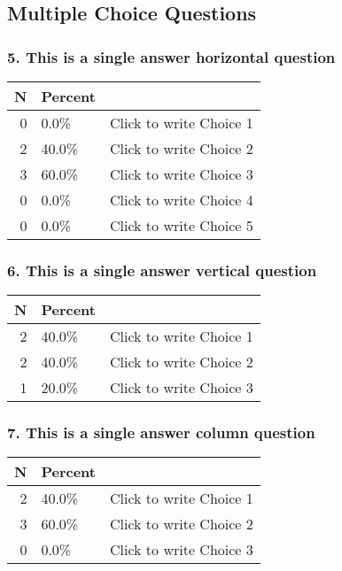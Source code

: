 \documentclass{article}\usepackage[]{graphicx}\usepackage[]{color}
\begin{document}
\hfill \break \hfill \break
\subsection*{Multiple Choice Questions}
\subsubsection*{5.
This is a single answer horizontal question}

\begin{tabular}{r|l|l}
\hline
N & Percent & \\
\hline
0 & 0.0\% & Click to write Choice 1\\
\hline
2 & 40.0\% & Click to write Choice 2\\
\hline
3 & 60.0\% & Click to write Choice 3\\
\hline
0 & 0.0\% & Click to write Choice 4\\
\hline
0 & 0.0\% & Click to write Choice 5\\
\hline
\end{tabular}


\hfill \break \hfill \break
\subsubsection*{6.
This is a single answer vertical question}

\begin{tabular}{r|l|l}
\hline
N & Percent & \\
\hline
2 & 40.0\% & Click to write Choice 1\\
\hline
2 & 40.0\% & Click to write Choice 2\\
\hline
1 & 20.0\% & Click to write Choice 3\\
\hline
\end{tabular}


\hfill \break \hfill \break
\subsubsection*{7.
This is a single answer column question}

\begin{tabular}{r|l|l}
\hline
N & Percent & \\
\hline
2 & 40.0\% & Click to write Choice 1\\
\hline
3 & 60.0\% & Click to write Choice 2\\
\hline
0 & 0.0\% & Click to write Choice 3\\
\hline
\end{tabular}
\end{document}
